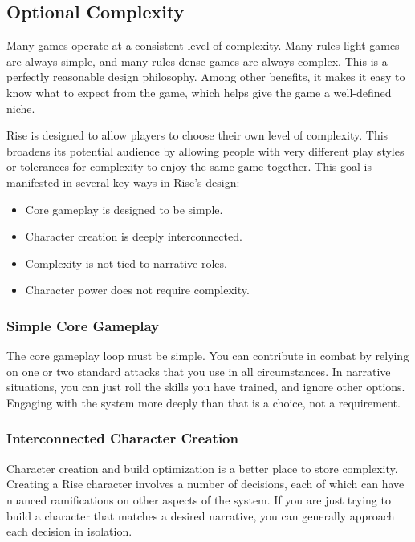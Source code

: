   \subsection{Optional Complexity}
    Many games operate at a consistent level of complexity.
    Many rules-light games are always simple, and many rules-dense games are always complex.
    This is a perfectly reasonable design philosophy.
    Among other benefits, it makes it easy to know what to expect from the game, which helps give the game a well-defined niche.

    Rise is designed to allow players to choose their own level of complexity.
    This broadens its potential audience by allowing people with very different play styles or tolerances for complexity to enjoy the same game together.
    This goal is manifested in several key ways in Rise's design:
    \begin{itemize}
      \item Core gameplay is designed to be simple.
      \item Character creation is deeply interconnected.
      \item Complexity is not tied to narrative roles.
      \item Character power does not require complexity.
    \end{itemize}

    \subsubsection{Simple Core Gameplay}
      The core gameplay loop must be simple.
      You can contribute in combat by relying on one or two standard attacks that you use in all circumstances.
      In narrative situations, you can just roll the skills you have trained, and ignore other options.
      Engaging with the system more deeply than that is a choice, not a requirement.

    \subsubsection{Interconnected Character Creation}
      Character creation and build optimization is a better place to store complexity.
      Creating a Rise character involves a number of decisions, each of which can have nuanced ramifications on other aspects of the system.
      If you are just trying to build a character that matches a desired narrative, you can generally approach each decision in isolation.


